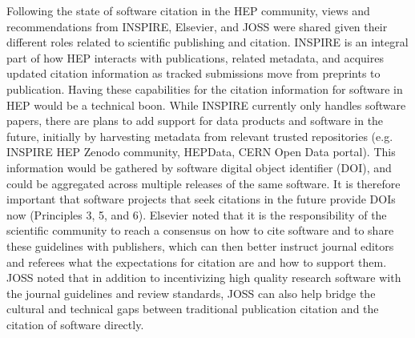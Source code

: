 Following the state of software citation in the HEP community, views and recommendations from INSPIRE, Elsevier, and JOSS were shared given their different roles related to scientific publishing and citation.
INSPIRE is an integral part of how HEP interacts with publications, related metadata, and acquires updated citation information as tracked submissions move from preprints to publication.
Having these capabilities for the citation information for software in HEP would be a technical boon.
While INSPIRE currently only handles software papers, there are plans to add support for data products and software in the future, initially by harvesting metadata from relevant trusted repositories (e.g. INSPIRE HEP Zenodo community, HEPData, CERN Open Data portal).
This information would be gathered by software digital object identifier (DOI), and could be aggregated across multiple releases of the same software.
It is therefore important that software projects that seek citations in the future provide DOIs now (Principles 3, 5, and 6).
Elsevier noted that it is the responsibility of the scientific community to reach a consensus on how to cite software and to share these guidelines with publishers, which can then better instruct journal editors and referees what the expectations for citation are and how to support them.
JOSS noted that in addition to incentivizing high quality research software with the journal guidelines and review standards, JOSS can also help bridge the cultural and technical gaps between traditional publication citation and the citation of software directly.
